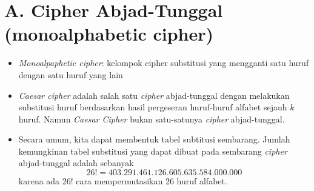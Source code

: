 \documentclass{article}
\begin{document}

\section*{A. Cipher Abjad-Tunggal (monoalphabetic cipher)}

\begin{itemize}
    \item \textit{Monoalpaphetic cipher}: kelompok cipher substitusi yang mengganti satu huruf dengan satu huruf yang lain
    \item \textit{Caesar cipher} adalah salah satu \textit{cipher} abjad-tunggal dengan melakukan substitusi huruf berdasarkan hasil pergeseran huruf-huruf alfabet sejauh $k$ huruf. Namun \textit{Caesar Cipher} bukan satu-satunya \textit{cipher} abjad-tunggal.
    \item Secara umum, kita dapat membentuk tabel subtitusi sembarang. Jumlah kemungkinan tabel substitusi yang dapat dibuat pada sembarang \textit{cipher} abjad-tunggal adalah sebanyak
    \[ 26! = 403.291.461.126.605.635.584.000.000 \]
    karena ada $26!$ cara mempermutasikan 26 huruf alfabet.
\end{itemize}
\end{document}

